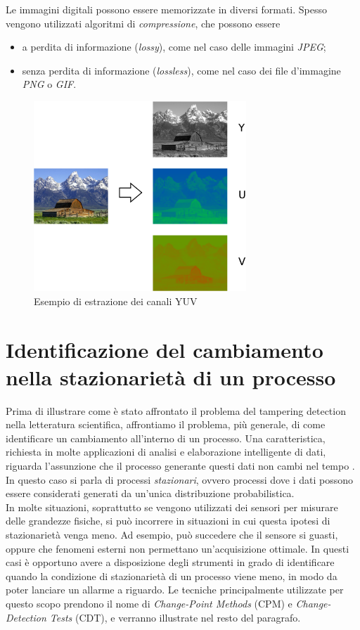Le immagini digitali possono essere memorizzate in diversi formati.
Spesso vengono utilizzati algoritmi di \textit{compressione}, che possono essere
\begin{itemize}
	\item a perdita di informazione (\textit{lossy}), come nel caso delle immagini \textit{JPEG};
	\item senza perdita di informazione (\textit{lossless}), come nel caso dei file d'immagine \textit{PNG} o \textit{GIF}.
\end{itemize}
	\begin{figure}[tb]
		\centering
		\includegraphics[width=8cm]{./pictures/yuv}
		\caption{Esempio di estrazione dei canali YUV}
		\label{fig:yuv}
	\end{figure}
	



\section{Identificazione del cambiamento nella stazionariet\`a di un processo}
\label{cdt}
Prima di illustrare come \`e stato affrontato il problema del tampering detection nella letteratura scientifica, affrontiamo il problema, pi\`u generale, di come identificare un cambiamento all'interno di un processo.
Una caratteristica, richiesta in molte applicazioni di analisi e elaborazione intelligente di dati, riguarda l'assunzione che il processo generante questi dati non cambi nel tempo \cite{alippi2014intelligence}. In questo caso si parla di processi \textit{stazionari}, ovvero processi dove i dati possono essere considerati generati da un'unica distribuzione probabilistica. \\
In molte situazioni, soprattutto se vengono utilizzati dei sensori per misurare delle grandezze fisiche, si pu\`o incorrere in situazioni in cui questa ipotesi di stazionariet\`a venga meno.
Ad esempio, pu\`o succedere che il sensore si guasti, oppure che fenomeni esterni non permettano un'acquisizione ottimale. 
In questi casi \`e opportuno avere a disposizione degli strumenti in grado di identificare quando la condizione di stazionariet\`a di un processo viene meno, in modo da poter lanciare un allarme a riguardo. 
Le tecniche principalmente utilizzate per questo scopo prendono il nome di \textit{Change-Point Methods} (CPM) e \textit{Change-Detection Tests} (CDT), e verranno illustrate nel resto del paragrafo.	

